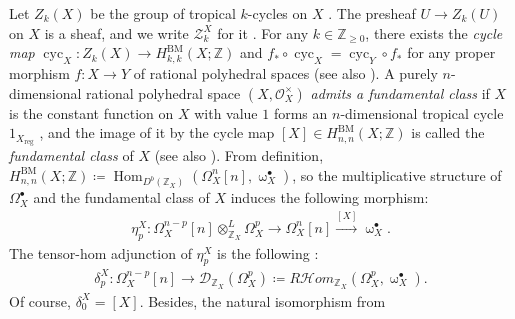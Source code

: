 \documentclass[a4paper,dvipdfmx,reqno,12pt]{amsart}
\theoremstyle{definition}
\newcommand{\deq}{\coloneqq}
\newcommand{\opn}[1]{\operatorname{#1}}
\newcommand{\xto}[1]{\xrightarrow{#1}}
\numberwithin{equation}{section}
\begin{document}
Let $Z_k(X)$ be the group of tropical $k$-cycles
on $X$ \cite[Definition 3.5]{MR4637248}.
The presheaf $U\to Z_k(U)$ on $X$ is a sheaf,
and we write $\mathscr{Z}_k^{X}$ for it
\cite[p.591]{MR4637248}.
For any $k\in \mathbb{Z}_{\geq 0}$, there
exists the \emph{cycle map}
$\opn{cyc}_X \colon Z_k(X)\to 
H^{\mathrm{BM}}_{k,k}(X;\mathbb{Z})$
and $f_*\circ \opn{cyc}_X=\opn{cyc}_Y \circ f_*$
for any proper morphism $f\colon X\to Y$ of rational
polyhedral spaces 
\cite[Definition 5.4 and Corollary 5.8]{MR4637248}
(see also \cite[Definition 4.13]{MR3894860}).
A purely $n$-dimensional rational polyhedral space
$(X,\mathcal{O}_X^{\times})$
\emph{admits a fundamental class} if
$X$ is the constant function on 
$X$ with value $1$ forms
an $n$-dimensional tropical cycle
$1_{X_{\mathrm{reg}}}$
\cite[]{MR4637248},
and the image of it by the cycle map
$[X]\in H_{n,n}^{\mathrm{BM}}(X;\mathbb{Z})$ 
is called the \emph{fundamental class} of $X$
(see also \cite[Definition 4.8]{MR3894860}).
From definition,
$H_{n,n}^{\mathrm{BM}}
(X;\mathbb{Z})\deq \opn{Hom}_{D^{b}(\mathbb{Z}_X)}
(\Omega_{X}^{n}[n],\upomega_{X}^{\bullet})$, so
the multiplicative structure of $\Omega_X^{\bullet}$
and the fundamental class of $X$ induces
the following morphism:
\begin{align}
\eta_{p}^{X}\colon \Omega_X^{n-p}[n]\otimes^{L}_{\mathbb{Z}_X}
\Omega_X^{p} \to \Omega_X^{n}[n] \xto{[X]}
\upomega_X^{\bullet}. 	
\end{align}
The tensor-hom adjunction of $\eta_{p}^{X}$ is
the following \cite[p.627]{MR4637248}:
\begin{align}
\delta_p^{X}\colon \Omega_X^{n-p}[n]\to 
\mathcal{D}_{\mathbb{Z}_X}(\Omega_X^{p})
\deq R\mathcal{H}om_{\mathbb{Z}_X}(\Omega_X^{p},
\upomega_X^{\bullet}).
\end{align}
Of course, $\delta_0^{X}=[X]$.
Besides, the natural isomorphism from
\end{document}
